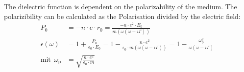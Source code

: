 \documentclass[ twoside,openright,titlepage,%
                paper=a4,fontsize=11pt,%
                ngerman
                ]{scrartcl}
\numberwithin{equation}{section}
\begin{document}
The dielectric function is dependent on the polarizability of the medium. The polarizibility can be calculated as the Polarisation divided by the electric field:
\begin{align}
P_0 &= -n \cdot e \cdot r_0 = \frac{-n \cdot e^2 \cdot E_0}{m(\omega(\omega - i \Gamma))} \label{eq:Polarisation} \\
\epsilon (\omega) &= 1 + \frac{P_0}{\epsilon_0 \cdot E_0} = 1 - \frac{n \cdot e^2}{\epsilon_0 \cdot m(\omega(\omega - i \Gamma))} = 1 - \frac{\omega_\text{p}^2}{\omega(\omega - i \Gamma)} \label{eq:DielectricFunction} \\
\text{mit} \ \ \omega_\text{p}& = \sqrt{\frac{n \cdot e^2}{\epsilon_0 \cdot m}} \label{eq:PlasmaFrequency}
\end{align}
\end{document}
